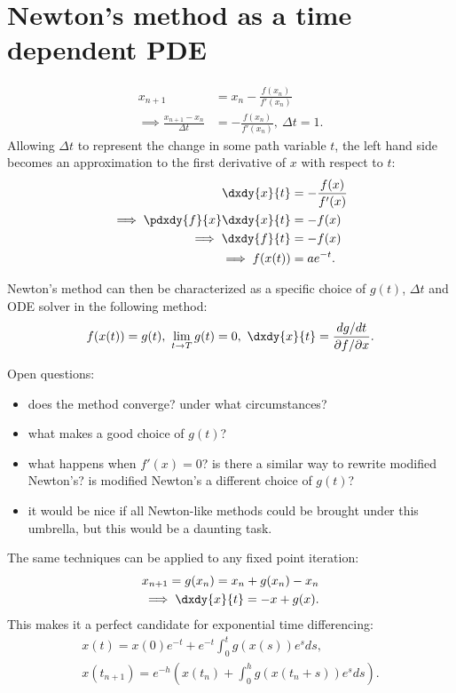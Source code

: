 \documentclass{book}
\begin{document}

\chapter{Newton's method as a time dependent PDE}

\begin{align*}
x_{n+1} & = x_n - \frac{f(x_n)}{f'(x_n)} \\
\implies \frac{x_{n+1} - x_n}{\Delta t} & = - \frac{f(x_n)}{f'(x_n)}, \ \Delta t = 1.
\end{align*}
Allowing $\Delta t$ to represent the change in some path variable $t$, the left hand side becomes an approximation to the first derivative of $x$ with respect to $t$:
\begin{align*}
\dxdy{x}{t} & = -\frac{f(x)}{f'(x)} \\
\implies \pdxdy{f}{x} \dxdy{x}{t} & = -f(x) \\
\implies \dxdy{f}{t} & = -f(x) \\
\implies f(x(t)) & = a e^{-t} .
\end{align*}

Newton's method can then be characterized as a specific choice of $g(t)$, $\Delta t$ and ODE solver in the following method:
\begin{align*}
f(x(t)) = g(t), \ \lim_{t \rightarrow T} g(t) = 0, \ 
\dxdy{x}{t} = \frac{ dg / dt }{ \partial f / \partial x } .
\end{align*}

Open questions:
\begin{itemize}
\item does the method converge? under what circumstances?
\item what makes a good choice of $g(t)$?
\item what happens when $f'(x) = 0$? is there a similar way to rewrite modified Newton's? is modified Newton's a different choice of $g(t)$?
\item it would be nice if all Newton-like methods could be brought under this umbrella, but this would be a daunting task.
\end{itemize}

The same techniques can be applied to any fixed point iteration:
\begin{align*}
x_{n+1} = g(x_n) = x_n + g(x_n) - x_n \\
\implies \dxdy{x}{t} = -x + g(x) .
\end{align*}
This makes it a perfect candidate for exponential time differencing:
\begin{align*}
x(t) = x(0) e^{-t} + e^{-t} \int_0^t g(x(s)) e^s ds, \\
x(t_{n+1}) = e^{-h} \left ( x(t_n) + \int_0^h g(x(t_n + s)) e^{s} ds \right ) .
\end{align*}
\end{document}
